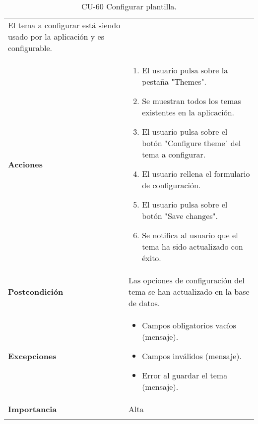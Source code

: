 \begin{longtable}[]{@{}ll@{}}
\begin{minipage}[t]{0.71\columnwidth}
El tema a configurar está siendo usado por la aplicación y es
configurable.\strut
\end{minipage}\tabularnewline
\begin{minipage}[t]{0.23\columnwidth}\raggedright
\textbf{Acciones}\strut
\end{minipage} & \begin{minipage}[t]{0.71\columnwidth}\raggedright
\begin{enumerate}
\def\labelenumi{\arabic{enumi}.}
\tightlist
\item
  El usuario pulsa sobre la pestaña "Themes".
\item
  Se muestran todos los temas existentes en la aplicación.
\item
  El usuario pulsa sobre el botón "Configure theme" del tema a
  configurar.
\item
  El usuario rellena el formulario de configuración.
\item
  El usuario pulsa sobre el botón "Save changes".
\item
  Se notifica al usuario que el tema ha sido actualizado con éxito.
\end{enumerate}\strut
\end{minipage}\tabularnewline
\begin{minipage}[t]{0.23\columnwidth}\raggedright
\textbf{Postcondición}\strut
\end{minipage} & \begin{minipage}[t]{0.71\columnwidth}\raggedright
Las opciones de configuración del tema se han actualizado en la base de
datos.\strut
\end{minipage}\tabularnewline
\begin{minipage}[t]{0.23\columnwidth}\raggedright
\textbf{Excepciones}\strut
\end{minipage} & \begin{minipage}[t]{0.71\columnwidth}\raggedright
\begin{itemize}
\tightlist
\item
  Campos obligatorios vacíos (mensaje).
\item
  Campos inválidos (mensaje).
\item
  Error al guardar el tema (mensaje).
\end{itemize}\strut
\end{minipage}\tabularnewline
\begin{minipage}[t]{0.23\columnwidth}\raggedright
\textbf{Importancia}\strut
\end{minipage} & \begin{minipage}[t]{0.71\columnwidth}\raggedright
Alta\strut
\end{minipage}\tabularnewline
\bottomrule
\caption{CU-60 Configurar plantilla.}
\end{longtable}

